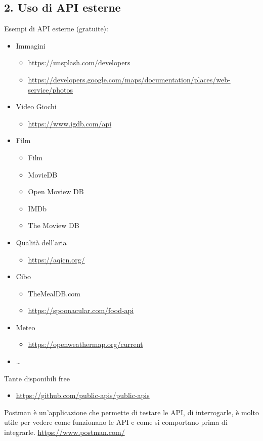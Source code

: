 \subsection{2. Uso di API esterne}
\par Esempi di API esterne (gratuite):
\begin{itemize}
    \item Immagini
    \begin{itemize}
        \item \url{https://unsplash.com/developers}
        \item \url{https://developers.google.com/maps/documentation/places/web-service/photos}
    \end{itemize}
    \item Video Giochi
    \begin{itemize}
        \item \url{https://www.igdb.com/api}
    \end{itemize}
    \item Film
    \begin{itemize}
        \item Film
        \item MovieDB
        \item Open Moview DB
        \item IMDb
        \item The Moview DB
    \end{itemize}
    \item Qualità dell'aria
    \begin{itemize}
        \item \url{https://aqicn.org/}
    \end{itemize}
    \item Cibo
    \begin{itemize}
        \item TheMealDB.com
        \item \url{https://spoonacular.com/food-api}
    \end{itemize}
    \item Meteo
    \begin{itemize}
        \item \url{https://openweathermap.org/current}
    \end{itemize}
    \item …
\end{itemize}
\par Tante disponibili free
\begin{itemize}
    \item \url{https://github.com/public-apis/public-apis}
\end{itemize}
\par Postman è un'applicazione che permette di testare le API, di interrogarle, è molto utile per vedere come funzionano le API e come si comportano prima di integrarle. \url{https://www.postman.com/}

